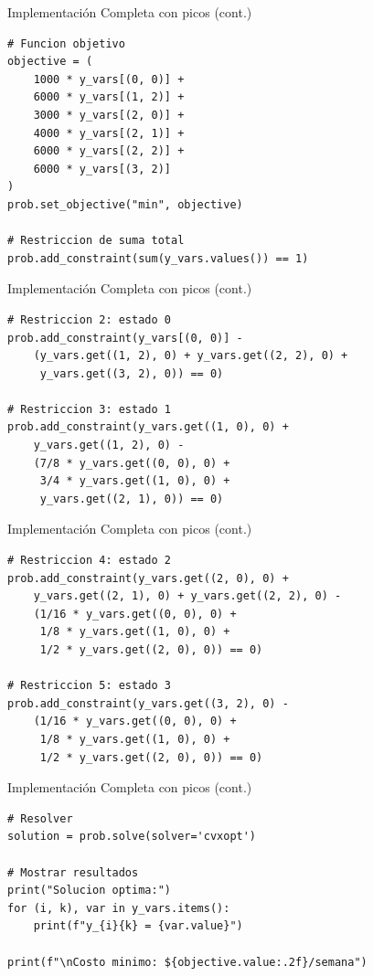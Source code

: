 \documentclass{beamer}
\begin{document}
\begin{frame}[fragile]{Implementación Completa con picos (cont.)}
    \small
    \begin{lstlisting}
# Funcion objetivo
objective = (
    1000 * y_vars[(0, 0)] +
    6000 * y_vars[(1, 2)] +
    3000 * y_vars[(2, 0)] +
    4000 * y_vars[(2, 1)] +
    6000 * y_vars[(2, 2)] +
    6000 * y_vars[(3, 2)]
)
prob.set_objective("min", objective)

# Restriccion de suma total
prob.add_constraint(sum(y_vars.values()) == 1)
    \end{lstlisting}
\end{frame}

\begin{frame}[fragile]{Implementación Completa con picos (cont.)}
    \small
    \begin{lstlisting}
# Restriccion 2: estado 0
prob.add_constraint(y_vars[(0, 0)] -
    (y_vars.get((1, 2), 0) + y_vars.get((2, 2), 0) +
     y_vars.get((3, 2), 0)) == 0)

# Restriccion 3: estado 1
prob.add_constraint(y_vars.get((1, 0), 0) +
    y_vars.get((1, 2), 0) -
    (7/8 * y_vars.get((0, 0), 0) +
     3/4 * y_vars.get((1, 0), 0) +
     y_vars.get((2, 1), 0)) == 0)
    \end{lstlisting}
\end{frame}

\begin{frame}[fragile]{Implementación Completa con picos (cont.)}
    \small
    \begin{lstlisting}
# Restriccion 4: estado 2
prob.add_constraint(y_vars.get((2, 0), 0) +
    y_vars.get((2, 1), 0) + y_vars.get((2, 2), 0) -
    (1/16 * y_vars.get((0, 0), 0) +
     1/8 * y_vars.get((1, 0), 0) +
     1/2 * y_vars.get((2, 0), 0)) == 0)

# Restriccion 5: estado 3
prob.add_constraint(y_vars.get((3, 2), 0) -
    (1/16 * y_vars.get((0, 0), 0) +
     1/8 * y_vars.get((1, 0), 0) +
     1/2 * y_vars.get((2, 0), 0)) == 0)
    \end{lstlisting}
\end{frame}

\begin{frame}[fragile]{Implementación Completa con picos (cont.)}
    \small
    \begin{lstlisting}
# Resolver
solution = prob.solve(solver='cvxopt')

# Mostrar resultados
print("Solucion optima:")
for (i, k), var in y_vars.items():
    print(f"y_{i}{k} = {var.value}")

print(f"\nCosto minimo: ${objective.value:.2f}/semana")
    \end{lstlisting}
\end{frame}
\end{document}
